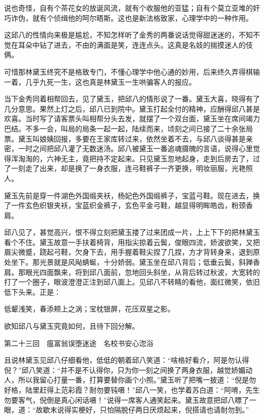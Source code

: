 \documentclass[12pt,UTF8]{ctexbook}
\begin{document}
{{{说也奇怪，自有个茶花女的放诞风流，就有个收服他的亚猛；自有个莫立亚堆的奸巧诈伪，就有个侦缉他的呵尔晤斯。这也是新法格致家，心理学中的一种作用。

这邱八的性情向来极是尴尬，不知怎样听了金秀的两番说话觉得甜迷迷的，不知不觉在耳朵中钻了进去，不由的满面是笑，连连点头。这真是名妓的揣摸迷人的伎俩。

可惜那林黛玉终究不是格致专门，不懂心理学中他心通的妙用，后来终久弄得棋输一着，几乎九死一生，这也真是林黛玉一生哄骗客人的报应。

当下金秀同着相帮回去，见了黛玉，把邱八的情形说了一番。黛玉大喜，晓得有了几分意思。果然上灯之后，邱八已到院中。黛玉打起全付的精神，应酬得邱八甚是欢喜。当时写了请客票头叫相帮分头去发，就摆了一个双台面，黛玉坐在席间竭力巴结。不多一会，叫局的局条一起一起，陆续而来，顷刻之间已接了二十余张局票。黛玉叫娘姨回报，多要在王家库转过来，依然坐着不去，与邱八谈得甚是亲密，一时之间把邱八灌了无数迷汤。邱八被黛玉一番追魂摄魄的言语，说得心里觉得浑淘淘的，六神无主，竟把持不定起来。只见黛玉忽地起身，走到后房去了，过了一刻走了出来，却是换了一身衣服，连弓鞋裤子一齐更换，明妆丽服，光艳照人。

黛玉先前是穿一件湖色外国缎夹袄，杨妃色外国缎裤子，宝蓝弓鞋。现在进去，换了一件玄色织银夹袄，宝蓝织金裤子，玄色平金弓鞋，越显得明眸皓齿，粉颈香肩。

邱八见了，甚觉高兴，恨不得立刻把黛玉搂了过来团成一片，上上下下的把林黛玉看个不住。黛玉故意一手扶着椅背，用指尖掠着云鬓，俊眼四流，娇波欲笑，又把眉尖微蹙，跷起弓鞋，欠身下去，用手握着鞋尖捏了几捏，方才背转身来，退到原处坐下。那光景就是风飐蜻蜒，十分娇弱。黛玉坐在邱八背后；低垂云鬓，斜亸香肩。那眼光四面飘来，将到邱八面前，忽地回头斜坐，从背后转过秋波，大宽转的打了一个圈子，眼波澄澄正注到邱八面上。见邱八不转睛的看他，面红微笑，依旧低下头来。正是：

低颦浅笑，春添颊上之涡；宝枕银屏，花压双星之影。

欲知邱八与黛玉究竟如何，且待下回分解。





第二十三回　瘟富翁误堕迷途　名校书安心淴浴





且说林黛玉见邱八仔细看他，低低的朝着邱八笑道：“啥格好看介，阿是勿认得倪？”邱八笑道：“并不是不认得你，只为你一刻之间换了两身衣服，越觉娇媚动人，所以我留心打量一番，打算要替你画个小照。”黛玉听了把嘴一披道：“倪是勿好格，陆里赶得上范彩霞？耐勿要钝嗫！”邱八一笑，也学着苏白道：“阿唷，先生勿要客气，倪倒是真心闲话嗫！”说得一席客人通笑起来。黛玉故意把邱八瞟了一眼，道：“故歇末说得实梗好，只怕隔脱仔两日厌烦起来，倪搭请也请耐勿到。”

}}}
\end{document}
